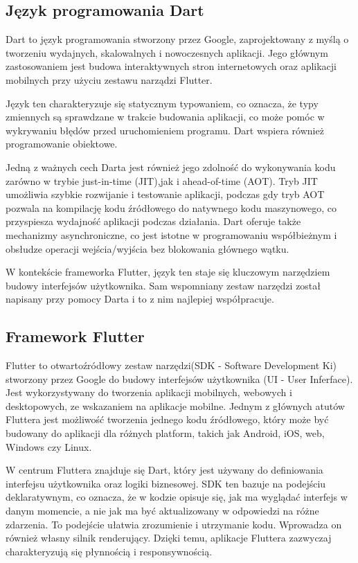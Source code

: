 \documentclass[12pt,twoside]{article}
\begin{document}
\subsection{Język programowania Dart}
Dart to język programowania stworzony przez Google, zaprojektowany z myślą o tworzeniu wydajnych, skalowalnych i nowoczesnych aplikacji. Jego głównym zastosowaniem jest budowa interaktywnych stron internetowych oraz aplikacji mobilnych przy użyciu zestawu narządzi Flutter.

Język ten charakteryzuje się statycznym typowaniem, co oznacza, że typy zmiennych są sprawdzane w trakcie budowania aplikacji, co może pomóc w wykrywaniu błędów przed uruchomieniem programu. Dart wspiera również programowanie obiektowe.

Jedną z ważnych cech Darta jest również jego zdolność do wykonywania kodu zarówno w trybie just-in-time (JIT),jak i ahead-of-time (AOT). Tryb JIT umożliwia szybkie rozwijanie i testowanie aplikacji, podczas gdy tryb AOT pozwala na kompilację
kodu źródłowego do natywnego kodu maszynowego, co przyspiesza wydajność aplikacji podczas działania. Dart oferuje także mechanizmy asynchroniczne, co jest istotne w programowaniu współbieżnym i obsłudze operacji wejścia/wyjścia bez blokowania głównego wątku.\cite{dartInfo}

W kontekście frameworka Flutter, język ten staje się kluczowym narzędziem budowy interfejsów użytkownika. Sam wspomniany zestaw narzędzi został napisany przy pomocy Darta i to z nim najlepiej współpracuje.
\subsection{Framework Flutter}
Flutter to otwartoźródłowy zestaw narzędzi(SDK - Software Development Ki) stworzony przez Google do budowy interfejsów użytkownika (UI - User Inferface). Jest wykorzystywany do tworzenia aplikacji mobilnych, webowych i desktopowych, ze wskazaniem na aplikacje mobilne. Jednym z głównych atutów Fluttera jest możliwość tworzenia jednego kodu źródłowego, który może być budowany do aplikacji dla różnych platform, takich jak Android, iOS, web, Windows czy Linux.

W centrum Fluttera znajduje się Dart, który jest używany do definiowania interfejsu użytkownika oraz logiki biznesowej.
SDK ten bazuje na podejściu deklaratywnym, co oznacza, że w kodzie opisuje się, jak ma wyglądać interfejs w danym momencie, a nie jak ma być aktualizowany w odpowiedzi na różne zdarzenia. To podejście ułatwia zrozumienie i utrzymanie kodu.
Wprowadza on również własny silnik renderujący. Dzięki temu, aplikacje Fluttera zazwyczaj charakteryzują się płynnością i responsywnością.
\end{document}
